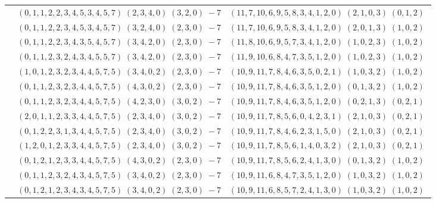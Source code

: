 \documentclass[11pt]{article}
\begin{document}
\begin{longtable}[l]{|c|c|c|}
 \cline{2-3} 
 & $(0 ,1 ,1 ,2 ,2 ,3 ,4 ,5 ,3 ,4 ,5 ,7) \;(2 ,3 ,4 ,0) \;(3 ,2 ,0) \;-7$ & $(11 ,7 ,10 ,6 ,9 ,5 ,8 ,3 ,4 ,1 ,2 ,0) \;(2 ,1 ,0 ,3) \;(0 ,1 ,2) \;$\\ 
 \cline{2-3} 
 & $(0 ,1 ,1 ,2 ,2 ,3 ,4 ,5 ,3 ,4 ,5 ,7) \;(3 ,2 ,4 ,0) \;(2 ,3 ,0) \;-7$ & $(11 ,7 ,10 ,6 ,9 ,5 ,8 ,3 ,4 ,1 ,2 ,0) \;(2 ,0 ,1 ,3) \;(1 ,0 ,2) \;$\\ 
 \cline{2-3} 
 & $(0 ,1 ,1 ,2 ,2 ,3 ,4 ,3 ,5 ,4 ,5 ,7) \;(3 ,4 ,2 ,0) \;(2 ,3 ,0) \;-7$ & $(11 ,8 ,10 ,6 ,9 ,5 ,7 ,3 ,4 ,1 ,2 ,0) \;(1 ,0 ,2 ,3) \;(1 ,0 ,2) \;$\\ 
 \cline{2-3} 
 & $(0 ,1 ,1 ,2 ,3 ,2 ,4 ,3 ,4 ,5 ,5 ,7) \;(3 ,4 ,2 ,0) \;(2 ,3 ,0) \;-7$ & $(11 ,9 ,10 ,6 ,8 ,4 ,7 ,3 ,5 ,1 ,2 ,0) \;(1 ,0 ,2 ,3) \;(1 ,0 ,2) \;$\\ 
 \cline{2-3} 
 & $(1 ,0 ,1 ,2 ,3 ,2 ,3 ,4 ,4 ,5 ,7 ,5) \;(3 ,4 ,0 ,2) \;(2 ,3 ,0) \;-7$ & $(10 ,9 ,11 ,7 ,8 ,4 ,6 ,3 ,5 ,0 ,2 ,1) \;(1 ,0 ,3 ,2) \;(1 ,0 ,2) \;$\\ 
 \cline{2-3} 
 & $(0 ,1 ,1 ,2 ,3 ,2 ,3 ,4 ,4 ,5 ,7 ,5) \;(4 ,3 ,0 ,2) \;(2 ,3 ,0) \;-7$ & $(10 ,9 ,11 ,7 ,8 ,4 ,6 ,3 ,5 ,1 ,2 ,0) \;(0 ,1 ,3 ,2) \;(1 ,0 ,2) \;$\\ 
 \cline{2-3} 
 & $(0 ,1 ,1 ,2 ,3 ,2 ,3 ,4 ,4 ,5 ,7 ,5) \;(4 ,2 ,3 ,0) \;(3 ,0 ,2) \;-7$ & $(10 ,9 ,11 ,7 ,8 ,4 ,6 ,3 ,5 ,1 ,2 ,0) \;(0 ,2 ,1 ,3) \;(0 ,2 ,1) \;$\\ 
 \cline{2-3} 
 & $(2 ,0 ,1 ,1 ,2 ,3 ,3 ,4 ,4 ,5 ,7 ,5) \;(2 ,3 ,4 ,0) \;(3 ,0 ,2) \;-7$ & $(10 ,9 ,11 ,7 ,8 ,5 ,6 ,0 ,4 ,2 ,3 ,1) \;(2 ,1 ,0 ,3) \;(0 ,2 ,1) \;$\\ 
 \cline{2-3} 
 & $(0 ,1 ,2 ,2 ,3 ,1 ,3 ,4 ,4 ,5 ,7 ,5) \;(2 ,3 ,4 ,0) \;(3 ,0 ,2) \;-7$ & $(10 ,9 ,11 ,7 ,8 ,4 ,6 ,2 ,3 ,1 ,5 ,0) \;(2 ,1 ,0 ,3) \;(0 ,2 ,1) \;$\\ 
 \cline{2-3} 
 & $(1 ,2 ,0 ,1 ,2 ,3 ,3 ,4 ,4 ,5 ,7 ,5) \;(2 ,3 ,4 ,0) \;(3 ,0 ,2) \;-7$ & $(10 ,9 ,11 ,7 ,8 ,5 ,6 ,1 ,4 ,0 ,3 ,2) \;(2 ,1 ,0 ,3) \;(0 ,2 ,1) \;$\\ 
 \cline{2-3} 
 & $(0 ,1 ,2 ,1 ,2 ,3 ,3 ,4 ,4 ,5 ,7 ,5) \;(4 ,3 ,0 ,2) \;(2 ,3 ,0) \;-7$ & $(10 ,9 ,11 ,7 ,8 ,5 ,6 ,2 ,4 ,1 ,3 ,0) \;(0 ,1 ,3 ,2) \;(1 ,0 ,2) \;$\\ 
 \cline{2-3} 
 & $(0 ,1 ,1 ,2 ,3 ,2 ,4 ,3 ,4 ,5 ,7 ,5) \;(3 ,4 ,0 ,2) \;(2 ,3 ,0) \;-7$ & $(10 ,9 ,11 ,6 ,8 ,4 ,7 ,3 ,5 ,1 ,2 ,0) \;(1 ,0 ,3 ,2) \;(1 ,0 ,2) \;$\\ 
 \cline{2-3} 
 & $(0 ,1 ,2 ,1 ,2 ,3 ,4 ,3 ,4 ,5 ,7 ,5) \;(3 ,4 ,0 ,2) \;(2 ,3 ,0) \;-7$ & $(10 ,9 ,11 ,6 ,8 ,5 ,7 ,2 ,4 ,1 ,3 ,0) \;(1 ,0 ,3 ,2) \;(1 ,0 ,2) \;$\\ 

\end{longtable}
\end{document}

